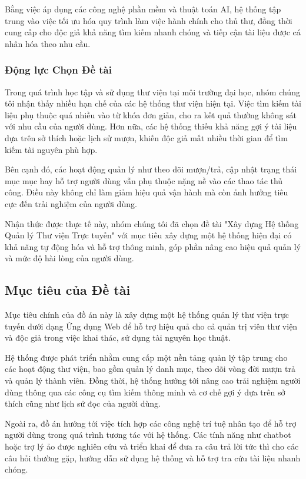 Bằng việc áp dụng các công nghệ phần mềm và thuật toán AI, hệ thống tập trung vào việc tối ưu hóa quy trình làm việc hành chính cho thủ thư, đồng thời cung cấp cho độc giả khả năng tìm kiếm nhanh chóng và tiếp cận tài liệu được cá nhân hóa theo nhu cầu.

\subsubsection{Động lực Chọn Đề tài}

Trong quá trình học tập và sử dụng thư viện tại môi trường đại học, nhóm chúng tôi nhận thấy nhiều hạn chế của các hệ thống thư viện hiện tại. Việc tìm kiếm tài liệu phụ thuộc quá nhiều vào từ khóa đơn giản, cho ra kết quả thường không sát với nhu cầu của người dùng. Hơn nữa, các hệ thống thiếu khả năng gợi ý tài liệu dựa trên sở thích hoặc lịch sử mượn, khiến độc giả mất nhiều thời gian để tìm kiếm tài nguyên phù hợp.

Bên cạnh đó, các hoạt động quản lý như theo dõi mượn/trả, cập nhật trạng thái mục mục hay hỗ trợ người dùng vẫn phụ thuộc nặng nề vào các thao tác thủ công. Điều này không chỉ làm giảm hiệu quả vận hành mà còn ảnh hưởng tiêu cực đến trải nghiệm của người dùng.

Nhận thức được thực tế này, nhóm chúng tôi đã chọn đề tài "Xây dựng Hệ thống Quản lý Thư viện Trực tuyến" với mục tiêu xây dựng một hệ thống hiện đại có khả năng tự động hóa và hỗ trợ thông minh, góp phần nâng cao hiệu quả quản lý và mức độ hài lòng của người dùng.

\subsection{Mục tiêu của Đề tài}

Mục tiêu chính của đồ án này là xây dựng một hệ thống quản lý thư viện trực tuyến dưới dạng Ứng dụng Web để hỗ trợ hiệu quả cho cả quản trị viên thư viện và độc giả trong việc khai thác, sử dụng tài nguyên học thuật.

Hệ thống được phát triển nhằm cung cấp một nền tảng quản lý tập trung cho các hoạt động thư viện, bao gồm quản lý danh mục, theo dõi vòng đời mượn trả và quản lý thành viên. Đồng thời, hệ thống hướng tới nâng cao trải nghiệm người dùng thông qua các công cụ tìm kiếm thông minh và cơ chế gợi ý dựa trên sở thích cũng như lịch sử đọc của người dùng.

Ngoài ra, đồ án hướng tới việc tích hợp các công nghệ trí tuệ nhân tạo để hỗ trợ người dùng trong quá trình tương tác với hệ thống. Các tính năng như chatbot hoặc trợ lý ảo được nghiên cứu và triển khai để đưa ra câu trả lời tức thì cho các câu hỏi thường gặp, hướng dẫn sử dụng hệ thống và hỗ trợ tra cứu tài liệu nhanh chóng.

